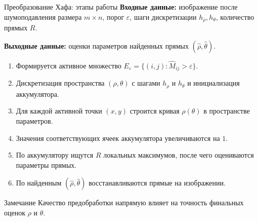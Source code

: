 \documentclass[unicode,notheorems]{beamer}
\begin{document}
%

\begin{frame}[shrink=18]{Преобразование Хафа: этапы работы}
	\textbf{Входные данные:} изображение после шумоподавления размера $m \times n$, порог $\varepsilon$, шаги дискретизации $h_{\rho}, h_{\theta}$, количество прямых $R$.

	\vspace{0.1cm}
	\textbf{Выходные данные:} оценки параметров найденных прямых $(\hat{\rho},\hat{\theta})$.

	\vspace{0.2cm}
	\begin{enumerate}
		\item Формируется активное множество $E_{\varepsilon}=\{(i,j):\widehat M_{ij}>\varepsilon\}$.
		\item Дискретизация пространства $(\rho,\theta)$ с шагами $h_\rho$ и $h_\theta$ и инициализация аккумулятора.
		\item Для каждой активной точки $(x,y)$ строится кривая $\rho(\theta)$ в пространстве параметров.
		\item Значения соответствующих ячеек аккумулятора увеличиваются на $1$.
		\item По аккумулятору ищутся $R$ локальных максимумов, после чего оцениваются параметры прямых.
		\item По найденным $(\hat{\rho},\hat{\theta})$ восстанавливаются прямые на изображении.
	\end{enumerate}

	\vspace{0.2cm}
	\begin{block}{Замечание}
		Качество предобработки напрямую влияет на точность финальных оценок $\rho$ и $\theta$.
	\end{block}
\end{frame}
\end{document}
